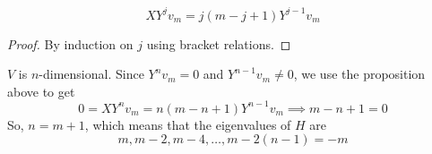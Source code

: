\documentclass{article}
\begin{document}
    \begin{proposition}
      \begin{equation}
        X Y^j v_m = j(m-j+1) Y^{j-1} v_m
      \end{equation}
    \end{proposition}
    \begin{proof}
      By induction on $j$ using bracket relations.
    \end{proof}

    $V$ is $n$-dimensional. Since $Y^n v_m = 0$ and $Y^{n-1} v_m \neq 0$, we use the proposition above to get
    \begin{equation}
      0 = X Y^n v_m = n (m-n+1) Y^{n-1} v_m \implies m-n+1=0
    \end{equation}
    So, $n = m+1$, which means that the eigenvalues of $H$ are
    \begin{equation}
      m, m-2, m-4, \ldots, m - 2(n-1) = -m
    \end{equation}
\end{document}
